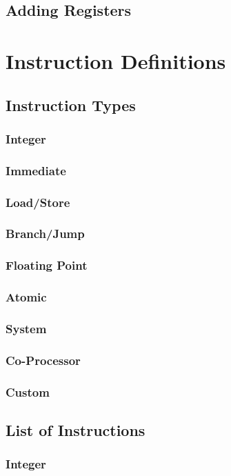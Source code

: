 \documentclass[letterpaper, 11pt]{article}
\begin{document}
\subsection{Adding Registers}


\section{Instruction Definitions}
\subsection{Instruction Types}
\subsubsection{Integer}
\subsubsection{Immediate}
\subsubsection{Load/Store}
\subsubsection{Branch/Jump}
\subsubsection{Floating Point}
\subsubsection{Atomic}
\subsubsection{System}
\subsubsection{Co-Processor}
\subsubsection{Custom}
\subsection{List of Instructions}
\subsubsection{Integer}
\end{document}
